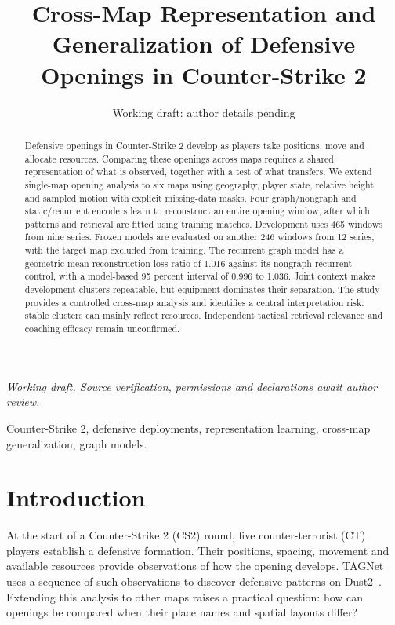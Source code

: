 
\title{Cross-Map Representation and Generalization of Defensive Openings in Counter-Strike 2}
\author{Working draft: author details pending}

\maketitle
\noindent\textit{Working draft. Source verification, permissions and declarations await author review.}

\begin{abstract}
Defensive openings in Counter-Strike 2 develop as players take positions, move and allocate resources. Comparing these openings across maps requires a shared representation of what is observed, together with a test of what transfers. We extend single-map opening analysis to six maps using geography, player state, relative height and sampled motion with explicit missing-data masks. Four graph/nongraph and static/recurrent encoders learn to reconstruct an entire opening window, after which patterns and retrieval are fitted using training matches. Development uses 465 windows from nine series. Frozen models are evaluated on another 246 windows from 12 series, with the target map excluded from training. The recurrent graph model has a geometric mean reconstruction-loss ratio of 1.016 against its nongraph recurrent control, with a model-based 95 percent interval of 0.996 to 1.036. Joint context makes development clusters repeatable, but equipment dominates their separation. The study provides a controlled cross-map analysis and identifies a central interpretation risk: stable clusters can mainly reflect resources. Independent tactical retrieval relevance and coaching efficacy remain unconfirmed. %
\end{abstract}
\begin{IEEEkeywords}
Counter-Strike 2, defensive deployments, representation learning, cross-map generalization, graph models.
\end{IEEEkeywords}

\section{Introduction}
At the start of a Counter-Strike 2 (CS2) round, five counter-terrorist (CT) players establish a defensive formation. Their positions, spacing, movement and available resources provide observations of how the opening develops. TAGNet uses a sequence of such observations to discover defensive patterns on Dust2~\cite{tagnet2026}. Extending this analysis to other maps raises a practical question: how can openings be compared when their place names and spatial layouts differ? %

